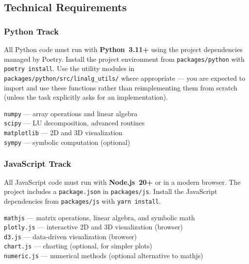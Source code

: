 \documentclass[a4paper,11pt]{article}
\begin{document}
\subsection{Technical Requirements}

\subsubsection{Python Track}

All Python code must run with \textbf{Python~3.11+} using the project dependencies managed by Poetry. Install the project environment from \texttt{packages/python} with \texttt{poetry install}. Use the utility modules in \texttt{packages/python/src/linalg\_utils/} where appropriate --- you are expected to import and use these functions rather than reimplementing them from scratch (unless the task explicitly asks for an implementation).

\begin{pythonbox}
  \texttt{numpy} --- array operations and linear algebra\\
  \texttt{scipy} --- LU decomposition, advanced routines\\
  \texttt{matplotlib} --- 2D and 3D visualization\\
  \texttt{sympy} --- symbolic computation (optional)
\end{pythonbox}

\subsubsection{JavaScript Track}

All JavaScript code must run with \textbf{Node.js~20+} or in a modern browser. The project includes a \texttt{package.json} in \texttt{packages/js}. Install the JavaScript dependencies from \texttt{packages/js} with \texttt{yarn install}.

\begin{jsbox}
  \texttt{mathjs} --- matrix operations, linear algebra, and symbolic math\\
  \texttt{plotly.js} --- interactive 2D and 3D visualization (browser)\\
  \texttt{d3.js} --- data-driven visualization (browser)\\
  \texttt{chart.js} --- charting (optional, for simpler plots)\\
  \texttt{numeric.js} --- numerical methods (optional alternative to mathjs)
\end{jsbox}
\end{document}
